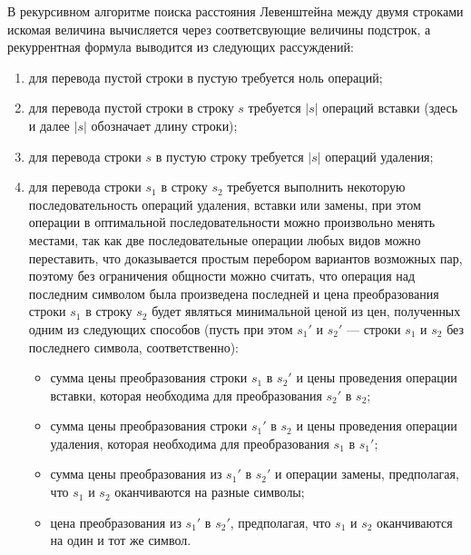 В рекурсивном алгоритме поиска расстояния Левенштейна между двумя строками
искомая величина вычисляется через соответсвующие величины подстрок, а
рекуррентная формула выводится из следующих рассуждений:
\begin{enumerate}[label=\arabic*)]
    \item для перевода пустой строки в пустую требуется ноль операций; 
    \item для перевода пустой строки в строку $s$ требуется $|s|$ операций
вставки (здесь и далее $|s|$ обозначает длину строки);
    \item для перевода строки $s$ в пустую строку требуется $|s|$ операций
удаления;
    \item для перевода строки $s_1$ в строку $s_2$ требуется выполнить
некоторую последовательность операций удаления, вставки или замены, при этом
операции в оптимальной последовательности можно произвольно менять местами, так
как две последовательные операции любых видов можно переставить, что
доказывается простым перебором вариантов возможных пар, поэтому без ограничения
общности можно считать, что операция над последним символом была произведена
последней и цена преобразования строки $s_1$ в строку $s_2$ будет являться
минимальной ценой из цен, полученных одним из следующих способов (пусть
при этом $s_1'$ и $s_2'$ --- строки $s_1$ и $s_2$ без последнего символа,
соответственно):
        \begin{itemize}[itemindent=\parindent,leftmargin=\parindent]
            \item сумма цены преобразования строки $s_1$ в $s_2'$  и цены
                проведения операции вставки, которая необходима для
                преобразования $s_2'$ в $s_2$;
            \item сумма цены преобразования строки $s_1'$ в $s_2$ и цены
                проведения операции удаления, которая необходима для
                преобразования $s_1$ в $s_1'$;
            \item сумма цены преобразования из $s_1'$ в $s_2'$ и операции
                замены, предполагая, что $s_1$ и $s_2$ оканчиваются на разные
                символы;
            \item цена преобразования из $s_1'$ в $s_2'$, предполагая, что
                $s_1$ и $s_2$ оканчиваются на один и тот же символ.
        \end{itemize}
\end{enumerate}


